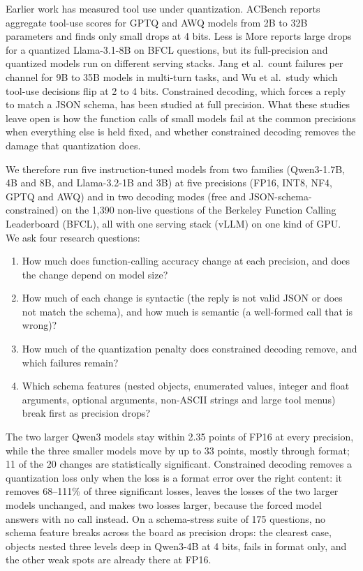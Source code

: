 \documentclass[conference]{IEEEtran}
\begin{document}
Earlier work has measured tool use under quantization. ACBench reports aggregate tool-use scores for GPTQ and
AWQ models from 2B to 32B parameters and finds only small drops at 4 bits. Less is More reports large drops for a
quantized Llama-3.1-8B on BFCL questions, but its full-precision and quantized models run on different serving
stacks. Jang et al.\ count failures per channel for 9B to 35B models in multi-turn tasks, and Wu et al.\ study
which tool-use decisions flip at 2 to 4 bits. Constrained decoding, which forces a reply to match a JSON schema,
has been studied at full precision. What these studies leave open is how the function calls of small models fail
at the common precisions when everything else is held fixed, and whether constrained decoding removes the damage
that quantization does.

We therefore run five instruction-tuned models from two families (Qwen3-1.7B, 4B and 8B, and Llama-3.2-1B and
3B) at five precisions (FP16, INT8, NF4, GPTQ and AWQ) and in two decoding modes (free and
JSON-schema-constrained) on the 1,390 non-live questions of the Berkeley Function Calling Leaderboard (BFCL), all with one
serving stack (vLLM) on one kind of GPU. We ask four research questions:
\begin{enumerate}
  \item[\textbf{RQ1}] How much does function-calling accuracy change at each precision, and does the change depend
        on model size?
  \item[\textbf{RQ2}] How much of each change is syntactic (the reply is not valid JSON or does not match the
        schema), and how much is semantic (a well-formed call that is wrong)?
  \item[\textbf{RQ3}] How much of the quantization penalty does constrained decoding remove, and which failures
        remain?
  \item[\textbf{RQ4}] Which schema features (nested objects, enumerated values, integer and float arguments,
        optional arguments, non-ASCII strings and large tool menus) break first as precision drops?
\end{enumerate}

The two larger Qwen3 models stay within 2.35 points of FP16 at every precision, while the three smaller models
move by up to 33 points, mostly through format; 11 of the 20 changes are statistically significant. Constrained
decoding removes a quantization loss only when the loss is a format error over the right content: it removes
68--111\% of three significant losses, leaves the losses of the two larger models unchanged, and makes two losses
larger, because the forced model answers with no call instead. On a schema-stress suite of 175 questions, no schema
feature breaks across the board as precision drops: the clearest case, objects nested three levels deep in Qwen3-4B
at 4 bits, fails in format only, and the other weak spots are already there at FP16.
\end{document}
